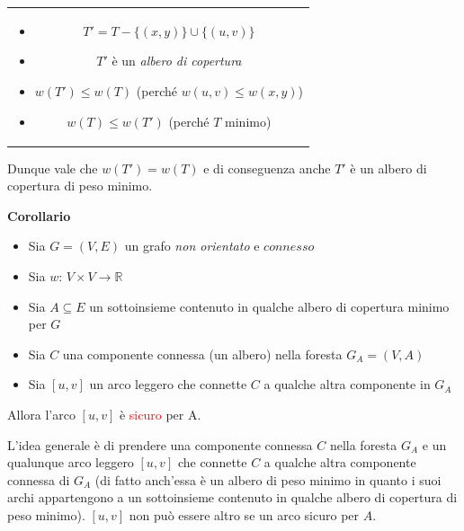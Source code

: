 \documentclass[../cheatSheetAlgoritmi.tex]{subfiles}
\begin{document}
\begin{table}[t]
\begin{tabular}{@{}c@{}}
\begin{minipage}{0.6\textwidth}
\begin{itemize}
	\item $T' = T - \{(x, y)\} \cup \{(u, v)\}$
	\item $T'$ è un \emph{albero di copertura}
	\item $w(T') \leq w(T)$ (perché $w(u, v) \leq w(x, y)$)
	\item $w(T) \leq w(T')$ (perché $T$ minimo)
\end{itemize}
\end{minipage} 
\end{tabular}
\end{table}


\bigskip

Dunque vale che $w(T') = w(T)$ e di conseguenza anche $T'$ è un albero di copertura di peso minimo.

\bigskip

\textbf{Corollario}
\begin{itemize}
	\item Sia $G = (V, E)$ un grafo \emph{non orientato} e $connesso$
	\item Sia $w$: $V \times V \rightarrow \mathbb{R}$
	\item Sia $A \subseteq E$ un sottoinsieme contenuto in qualche albero di copertura minimo per $G$
	\item Sia $C$ una componente connessa (un albero) nella foresta $G_{A} = (V, A)$
	\item Sia $[u, v]$ un arco leggero che connette $C$ a qualche altra componente in $G_{A}$
\end{itemize}
Allora l'arco $[u, v]$ è \textcolor{red}{sicuro} per A.

\bigskip

L'idea generale è di prendere una componente connessa $C$ nella foresta $G_{A}$ e un qualunque arco leggero $[u, v]$ che connette $C$ a qualche altra componente connessa di $G_{A}$ (di fatto anch'essa è un albero di peso minimo in quanto i suoi archi appartengono a un sottoinsieme contenuto in qualche albero di copertura di peso minimo). $[u, v]$ non può essere altro se un arco sicuro per $A$.
\newpage
\end{document}
